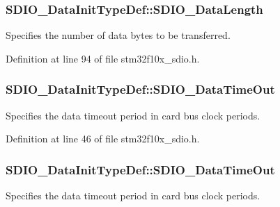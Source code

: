 \subsubsection[{\texorpdfstring{S\+D\+I\+O\+\_\+\+Data\+Length}{SDIO_DataLength}}]{ S\+D\+I\+O\+\_\+\+Data\+Init\+Type\+Def\+::\+S\+D\+I\+O\+\_\+\+Data\+Length}\hypertarget{struct_s_d_i_o___data_init_type_def_ac325889a6dd582130a752aafc3ec9ee9}{}\label{struct_s_d_i_o___data_init_type_def_ac325889a6dd582130a752aafc3ec9ee9}
Specifies the number of data bytes to be transferred. 

Definition at line 94 of file stm32f10x\+\_\+sdio.\+h.

\subsubsection[{\texorpdfstring{S\+D\+I\+O\+\_\+\+Data\+Time\+Out}{SDIO_DataTimeOut}}]{ S\+D\+I\+O\+\_\+\+Data\+Init\+Type\+Def\+::\+S\+D\+I\+O\+\_\+\+Data\+Time\+Out}\hypertarget{struct_s_d_i_o___data_init_type_def_a3580856d1890da4c1097abcc0370135c}{}\label{struct_s_d_i_o___data_init_type_def_a3580856d1890da4c1097abcc0370135c}
Specifies the data timeout period in card bus clock periods. 

Definition at line 46 of file stm32f10x\+\_\+sdio.\+h.

\subsubsection[{\texorpdfstring{S\+D\+I\+O\+\_\+\+Data\+Time\+Out}{SDIO_DataTimeOut}}]{ S\+D\+I\+O\+\_\+\+Data\+Init\+Type\+Def\+::\+S\+D\+I\+O\+\_\+\+Data\+Time\+Out}\hypertarget{struct_s_d_i_o___data_init_type_def_a6877ec1042a273e228114e5362b93aa1}{}\label{struct_s_d_i_o___data_init_type_def_a6877ec1042a273e228114e5362b93aa1}
Specifies the data timeout period in card bus clock periods. 

